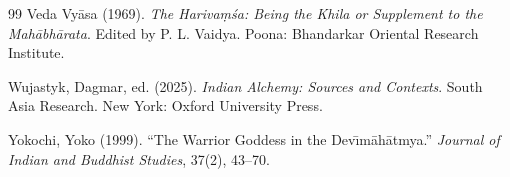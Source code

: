 \documentclass[11pt,twoside,letterpaper]{article}
\begin{document}
\begin{thebibliography}{99}
Veda Vyāsa (1969). \textit{The Harivaṃśa: Being the Khila or Supplement to the Mahābhārata}. Edited by P. L. Vaidya. Poona: Bhandarkar Oriental Research Institute.

Wujastyk, Dagmar, ed. (2025). \textit{Indian Alchemy: Sources and Contexts}. South Asia Research. New York: Oxford University Press.

Yokochi, Yoko (1999). ``The Warrior Goddess in the Dev\={\i}m\={a}h\={a}tmya.'' \textit{Journal of Indian and Buddhist Studies}, 37(2), 43--70.

\end{thebibliography}
\end{document}
